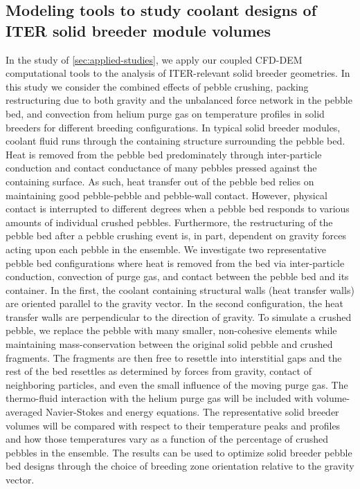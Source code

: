 \subsection*{Modeling tools to study coolant designs of ITER solid breeder module volumes}
In the study of \cref{sec:applied-studies}, we apply our coupled CFD-DEM computational tools to the analysis of ITER-relevant solid breeder geometries. In this study we consider the combined effects of pebble crushing, packing restructuring due to both gravity and the unbalanced force network in the pebble bed, and convection from helium purge gas on temperature profiles in solid breeders for different breeding configurations. In typical solid breeder modules, coolant fluid runs through the containing structure surrounding the pebble bed. Heat is removed from the pebble bed predominately through inter-particle conduction and contact conductance of many pebbles pressed against the containing surface. As such, heat transfer out of the pebble bed relies on maintaining good pebble-pebble and pebble-wall contact. However, physical contact is interrupted to different degrees when a pebble bed responds to various amounts of individual crushed pebbles. Furthermore, the restructuring of the pebble bed after a pebble crushing event is, in part, dependent on gravity forces acting upon each pebble in the ensemble. We investigate two representative pebble bed configurations where heat is removed from the bed via inter-particle conduction, convection of purge gas, and contact between the pebble bed and its container. In the first, the coolant containing structural walls (heat transfer walls) are oriented parallel to the gravity vector. In the second configuration, the heat transfer walls are perpendicular to the direction of gravity. To simulate a crushed pebble, we replace the pebble with many smaller, non-cohesive elements while maintaining mass-conservation between the original solid pebble and crushed fragments. The fragments are then free to resettle into interstitial gaps and the rest of the bed resettles as determined by forces from gravity, contact of neighboring particles, and even the small influence of the moving purge gas. The thermo-fluid interaction with the helium purge gas will be included with volume-averaged Navier-Stokes and energy equations. The representative solid breeder volumes will be compared with respect to their temperature peaks and profiles and how those temperatures vary as a function of the percentage of crushed pebbles in the ensemble. The results can be used to optimize solid breeder pebble bed designs through the choice of breeding zone orientation relative to the gravity vector.

